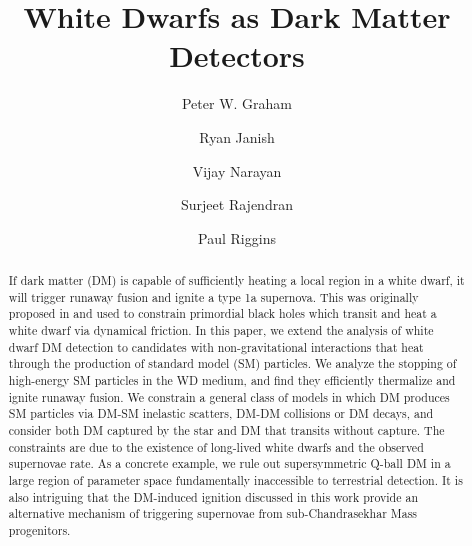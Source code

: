 \documentclass[preprintnumbers,amsmath,amssymb,prd,superscriptaddress]{revtex4}
\begin{document}

\title{White Dwarfs as Dark Matter Detectors}

\author{Peter W. Graham}

\author{Ryan Janish}

\author{Vijay Narayan}

\author{Surjeet Rajendran}

\author{Paul Riggins}

\begin{abstract}
If dark matter (DM) is capable of sufficiently heating a local region in a white dwarf, it will trigger runaway fusion and ignite a type 1a supernova.
This was originally proposed in \cite{Graham:2015apa} and used to constrain primordial black holes which transit and heat a white dwarf via dynamical friction.
In this paper, we extend the analysis of white dwarf DM detection to candidates with non-gravitational interactions that heat through the production of standard model (SM) particles.
We analyze the stopping of high-energy SM particles in the WD medium, and find they efficiently thermalize and ignite runaway fusion.
We constrain a general class of models in which DM produces SM particles via DM-SM inelastic scatters, DM-DM collisions or DM decays, and consider both DM captured by the star and DM that transits without capture.
The constraints are due to the existence of long-lived white dwarfs and the observed supernovae rate.
As a concrete example, we rule out supersymmetric Q-ball DM in a large region of parameter space fundamentally inaccessible to terrestrial detection.
It is also intriguing that the DM-induced ignition discussed in this work provide an alternative mechanism of triggering supernovae from sub-Chandrasekhar Mass progenitors.
\end{abstract}

\maketitle
\end{document}
